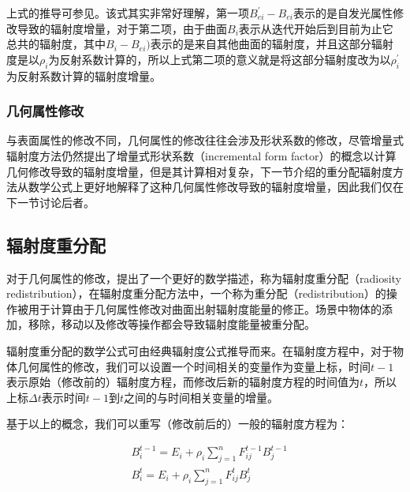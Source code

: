 \noindent 上式的推导可参见\cite{a:IncrementalRadiosity:AnExtensionofProgressiveRadiositytoanInteractiveImageSynthesisSystem,a:ImprovingInteractionWithRadiositybasedLightingSimulationPrograms}。该式其实非常好理解，第一项$B^{'}_{ei}-B_{ei}$表示的是自发光属性修改导致的辐射度增量，对于第二项，由于曲面$B_i$表示从迭代开始后到目前为止它总共的辐射度，其中$B_i-B_{ei})$表示的是来自其他曲面的辐射度，并且这部分辐射度是以$\rho_i$为反射系数计算的，所以上式第二项的意义就是将这部分辐射度改为以$\rho^{'}_i$为反射系数计算的辐射度增量。




\subsubsection{几何属性修改}
与表面属性的修改不同，几何属性的修改往往会涉及形状系数的修改，尽管增量式辐射度方法仍然提出了增量式形状系数（incremental form factor）的概念以计算几何修改导致的辐射度增量，但是其计算相对复杂，下一节介绍的重分配辐射度方法从数学公式上更好地解释了这种几何属性修改导致的辐射度增量，因此我们仅在下一节讨论后者。





\subsection{辐射度重分配}\label{sec:r-radiosity-redistribution}
对于几何属性的修改，\cite{a:RadiosityRedistributionforDynamicEnvironments}提出了一个更好的数学描述，称为辐射度重分配（radiosity redistribution），在辐射度重分配方法中，一个称为重分配（redistribution）的操作被用于计算由于几何属性修改对曲面出射辐射度能量的修正。场景中物体的添加，移除，移动以及修改等操作都会导致辐射度能量被重分配。

辐射度重分配的数学公式可由经典辐射度公式推导而来。在辐射度方程中，对于物体几何属性的修改，我们可以设置一个时间相关的变量作为变量上标，时间$t-1$表示原始（修改前的）辐射度方程，而修改后新的辐射度方程的时间值为$t$，所以上标$\Delta t$表示时间$t-1$到$t$之间的与时间相关变量的增量。

基于以上的概念，我们可以重写（修改前后的）一般的辐射度方程为：

\begin{equation}
	\begin{aligned}
		&B^{t-1}_i=E_i+\rho_i \sum^{n}_{j=1}F^{t-1}_{ij}B^{t-1}_j\\
		&B^{t}_i=E_i+\rho_i \sum^{n}_{j=1}F^{t}_{ij}B^{t}_j
	\end{aligned}
\end{equation}

